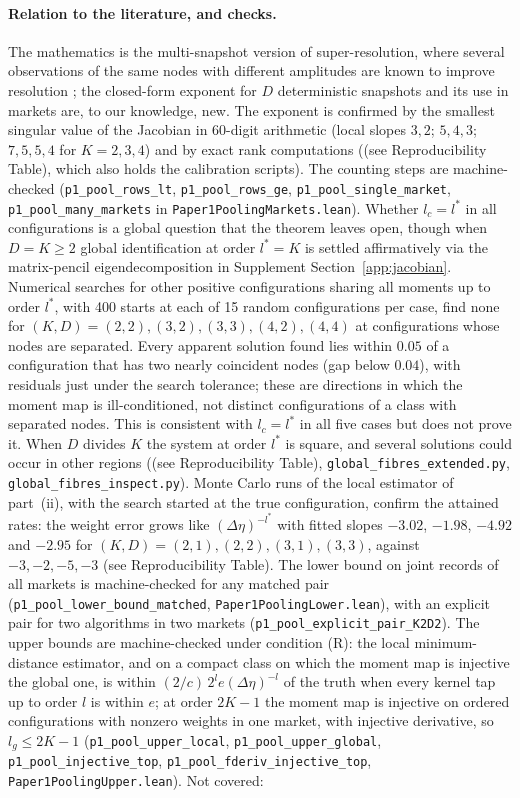 \documentclass[12pt]{article}
\theoremstyle{definition}
\theoremstyle{remark}
\begin{document}
\paragraph{Relation to the literature, and checks.} The mathematics is the multi-snapshot version of super-resolution, where several observations of the same nodes with different amplitudes are known to improve resolution \citep{li2022}; the closed-form exponent for $D$ deterministic snapshots and its use in markets are, to our knowledge, new. The exponent is confirmed by the smallest singular value of the Jacobian in 60-digit arithmetic (local slopes $3,2$; $5,4,3$; $7,5,5,4$ for $K=2,3,4$) and by exact rank computations ((see Reproducibility Table), which also holds the calibration scripts). The counting steps are machine-checked (\texttt{p1\_pool\_rows\_lt}, \texttt{p1\_pool\_rows\_ge}, \texttt{p1\_pool\_single\_market}, \texttt{p1\_pool\_many\_markets} in \nolinkurl{Paper1PoolingMarkets.lean}). Whether $l_c=l^*$ in all configurations is a global question that the theorem leaves open, though when $D=K\ge2$ global identification at order $l^*=K$ is settled affirmatively via the matrix-pencil eigendecomposition in Supplement Section~\ref{app:jacobian}. Numerical searches for other positive configurations sharing all moments up to order $l^*$, with 400 starts at each of 15 random configurations per case, find none for $(K,D)=(2,2),(3,2),(3,3),(4,2),(4,4)$ at configurations whose nodes are separated. Every apparent solution found lies within $0.05$ of a configuration that has two nearly coincident nodes (gap below $0.04$), with residuals just under the search tolerance; these are directions in which the moment map is ill-conditioned, not distinct configurations of a class with separated nodes. This is consistent with $l_c=l^*$ in all five cases but does not prove it. When $D$ divides $K$ the system at order $l^*$ is square, and several solutions could occur in other regions ((see Reproducibility Table), \nolinkurl{global_fibres_extended.py}, \nolinkurl{global_fibres_inspect.py}). Monte Carlo runs of the local estimator of part~(ii), with the search started at the true configuration, confirm the attained rates: the weight error grows like $(\Delta\eta)^{-l^*}$ with fitted slopes $-3.02$, $-1.98$, $-4.92$ and $-2.95$ for $(K,D)=(2,1),(2,2),(3,1),(3,3)$, against $-3,-2,-5,-3$ (see Reproducibility Table). The lower bound on joint records of all markets is machine-checked for any matched pair (\texttt{p1\_pool\_lower\_bound\_matched}, \nolinkurl{Paper1PoolingLower.lean}), with an explicit pair for two algorithms in two markets (\texttt{p1\_pool\_explicit\_pair\_K2D2}). The upper bounds are machine-checked under condition (R): the local minimum-distance estimator, and on a compact class on which the moment map is injective the global one, is within $(2/c)\,2^l e(\Delta\eta)^{-l}$ of the truth when every kernel tap up to order $l$ is within $e$; at order $2K-1$ the moment map is injective on ordered configurations with nonzero weights in one market, with injective derivative, so $l_g\le2K-1$ (\texttt{p1\_pool\_upper\_local}, \texttt{p1\_pool\_upper\_global}, \texttt{p1\_pool\_injective\_top}, \texttt{p1\_pool\_fderiv\_injective\_top}, \nolinkurl{Paper1PoolingUpper.lean}). Not covered: 
\end{document}
